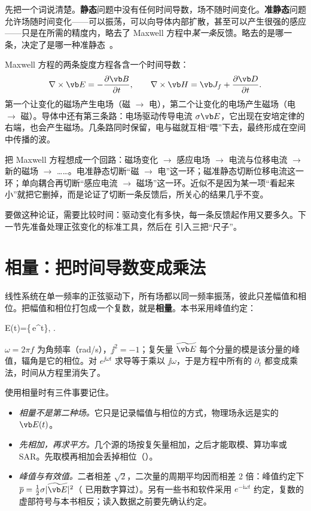 先把一个词说清楚。\textbf{静态}问题中没有任何时间导数，场不随时间变化。\textbf{准静态}问题允许场随时间变化——可以振荡，可以向导体内部扩散，甚至可以产生很强的感应——只是在所需的精度内，略去了 Maxwell 方程中\emph{某一条}反馈。略去的是哪一条，决定了是哪一种准静态~\cite{haus,qslimits}。

Maxwell 方程的两条旋度方程各含一个时间导数：
\begin{equation}
\nabla\times\vb E=-\frac{\partial\vb B}{\partial t},\qquad
\nabla\times\vb H=\vb J_f+\frac{\partial\vb D}{\partial t}.
\label{eq:regimes-curls}
\end{equation}
第一个让变化的磁场产生电场（磁 $\to$ 电），第二个让变化的电场产生磁场（电 $\to$ 磁）。导体中还有第三条路：电场驱动传导电流 $\sigma\vb E$，它出现在安培定律的右端，也会产生磁场。几条路同时保留，电与磁就互相“喂”下去，最终形成在空间中传播的波。

\begin{intuition}[近似就是切断一条反馈]
把 Maxwell 方程想成一个回路：磁场变化 $\to$ 感应电场 $\to$ 电流与位移电流 $\to$ 新的磁场 $\to$ ……。电准静态切断“磁 $\to$ 电”这一环；磁准静态切断位移电流这一环；单向耦合再切断“感应电流 $\to$ 磁场”这一环。近似不是因为某一项“看起来小”就把它删掉，而是论证了切断一条反馈后，所关心的结果几乎不变。
\end{intuition}

要做这种论证，需要比较时间：驱动变化有多快，每一条反馈起作用又要多久。下一节先准备处理正弦变化的标准工具，然后在 引入三把“尺子”。

\section{相量：把时间导数变成乘法}\label{sec:regimes-phasor}

线性系统在单一频率的正弦驱动下，所有场都以同一频率振荡，彼此只差幅值和相位。把幅值和相位打包成一个复数，就是\textbf{相量}。本书采用峰值约定：
\begin{keyeq}
\vb E(t)=\bigl\{\,e^{\jj\omega t}\bigr\},\qquad
{}\;\longrightarrow\;\jj\omega .
\label{eq:phasor}
\end{keyeq}
$\omega=2\pi f$ 为角频率（rad/s），$\jj^2=-1$；复矢量 $\widetilde{\vb E}$ 每个分量的模是该分量的峰值，辐角是它的相位。对 $e^{\jj\omega t}$ 求导等于乘以 $\jj\omega$，于是方程中所有的 $\partial_t$ 都变成乘法，时间从方程里消失了。

使用相量时有三件事要记住。
\begin{itemize}
\item \emph{相量不是第二种场。}它只是记录幅值与相位的方式，物理场永远是实的 $\vb E(t)$。
\item \emph{先相加，再求平方。}几个源的场按复矢量相加，之后才能取模、算功率或 SAR。先取模再相加会丢掉相位（）。
\item \emph{峰值与有效值。}二者相差 $\sqrt2$，二次量的周期平均因而相差 2 倍：峰值约定下 $\overline p=\tfrac12\sigma|\widetilde{\vb E}|^2$（ 已用数字算过）。另有一些书和软件采用 $e^{-\mathrm i\omega t}$ 约定，复数的虚部符号与本书相反；读入数据之前要先确认约定。
\end{itemize}

